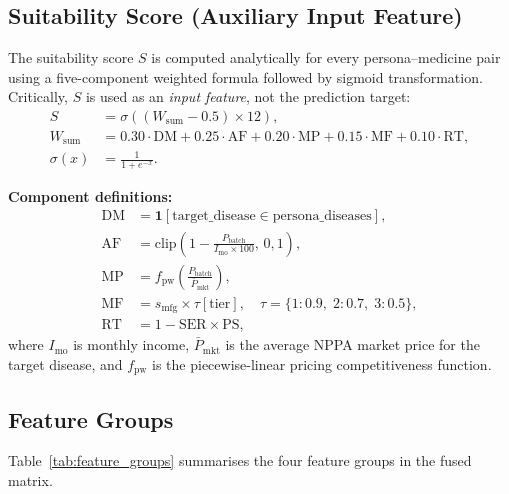\documentclass[10pt,journal,compsoc]{IEEEtran}
\newcommand{\sigmoid}{\sigma}
\begin{document}
\subsection{Suitability Score (Auxiliary Input Feature)}

The suitability score $S$ is computed analytically for every persona--medicine pair
using a five-component weighted formula followed by sigmoid transformation.
Critically, $S$ is used as an \emph{input feature}, not the prediction target:
\begin{align}
  S &= \sigmoid\!\left((W_{\text{sum}}-0.5)\times 12\right),
  \label{eq:suit_sigmoid}\\
  W_{\text{sum}} &= 0.30\cdot\text{DM}+0.25\cdot\text{AF}
                   +0.20\cdot\text{MP}+0.15\cdot\text{MF}+0.10\cdot\text{RT},
  \label{eq:wsum}\\
  \sigmoid(x) &= \frac{1}{1+e^{-x}}.
  \label{eq:sigmoid}
\end{align}

\textbf{Component definitions:}
\begin{align}
  \text{DM} &= \mathbf{1}[\text{target\_disease}\in\text{persona\_diseases}],
  \label{eq:dm}\\
  \text{AF} &= \mathrm{clip}\!\left(1-\frac{P_{\text{batch}}}{I_{\text{mo}}\times100},\,0,1\right),
  \label{eq:af}\\
  \text{MP} &= f_{\text{pw}}\!\left(\frac{P_{\text{batch}}}{\bar{P}_{\text{mkt}}}\right),
  \label{eq:mp}\\
  \text{MF} &= s_{\text{mfg}}\times\tau[\text{tier}],\quad
              \tau=\{1{:}0.9,\;2{:}0.7,\;3{:}0.5\},
  \label{eq:mf}\\
  \text{RT} &= 1-\text{SER}\times\text{PS},
  \label{eq:rt}
\end{align}
where $I_{\text{mo}}$ is monthly income, $\bar{P}_{\text{mkt}}$ is the average NPPA
market price for the target disease, and $f_{\text{pw}}$ is the piecewise-linear
pricing competitiveness function.

\subsection{Feature Groups}

Table~\ref{tab:feature_groups} summarises the four feature groups in the fused matrix.
\end{document}
